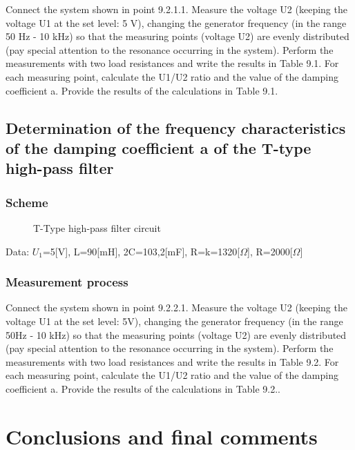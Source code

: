\documentclass[]{scrartcl}
\begin{document}
Connect the system shown in point 9.2.1.1. Measure the voltage U2 (keeping the voltage U1 at the set level: 5 V), changing the generator frequency (in the range 50 Hz - 10 kHz) so that the measuring points (voltage U2) are evenly distributed (pay special attention to the resonance occurring in the system). Perform the measurements with two load resistances and write the results in Table 9.1. For each measuring point, calculate the U1/U2 ratio and the value of the damping coefficient a. Provide the results of the calculations in Table 9.1.



\subsection{Determination of the frequency characteristics of the damping coefficient a of the T-type high-pass filter}

\subsubsection{Scheme}

\begin{figure}[H]
	\centering
	
	\caption{T-Type high-pass filter circuit}
	\label{fig:circuitfig_parallel}
\end{figure}

Data: $U_1$=5[V], L=90[mH], 2C=103,2[mF], R=k=1320[$\Omega$], R=2000[$\Omega$]

\subsubsection{Measurement process}

Connect the system shown in point 9.2.2.1. Measure the voltage U2 (keeping the voltage U1 at the set level: 5V), changing the generator frequency (in the range 50Hz - 10 kHz) so that the measuring points (voltage U2) are evenly distributed (pay special attention to the resonance occurring in the system). Perform the measurements with two load resistances and write the results in Table 9.2. For each measuring point, calculate the U1/U2 ratio and the value of the damping coefficient a. Provide the results of the calculations in Table 9.2..



\section{Conclusions and final comments}
\end{document}
